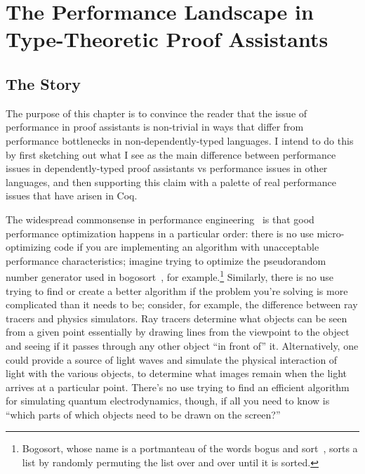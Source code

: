 \chapter{The Performance Landscape in Type-Theoretic Proof Assistants} \label{ch:perf-failures}
\section{The Story}\label{sec:perf-failures:story}
The purpose of this chapter is to convince the reader that the issue of performance in proof assistants is non-trivial in ways that differ from performance bottlenecks in non-dependently-typed languages.
I intend to do this by first sketching out what I see as the main difference between performance issues in dependently-typed proof assistants vs performance issues in other languages, and then supporting this claim with a palette of real performance issues that have arisen in Coq.

The widespread commonsense in performance engineering~\cite{commonsense-perf-engineering-order-of-operations} is that good performance optimization happens in a particular order:
there is no use micro-optimizing code if you are implementing an algorithm with unacceptable performance characteristics; imagine trying to optimize the pseudorandom number generator used in bogosort~\cite{Sorting2007Gruber}, for example.\footnote{Bogosort, whose name is a portmanteau of the words bogus and sort~\cite{bogosort-name}, sorts a list by randomly permuting the list over and over until it is sorted.}
Similarly, there is no use trying to find or create a better algorithm if the problem you're solving is more complicated than it needs to be; consider, for example, the difference between ray tracers and physics simulators.
Ray tracers determine what objects can be seen from a given point essentially by drawing lines from the viewpoint to the object and seeing if it passes through any other object ``in front of'' it.
Alternatively, one could provide a source of light waves and simulate the physical interaction of light with the various objects, to determine what images remain when the light arrives at a particular point.
There's no use trying to find an efficient algorithm for simulating quantum electrodynamics, though, if all you need to know is ``which parts of which objects need to be drawn on the screen?''

